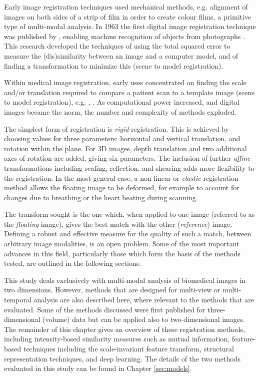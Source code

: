 \documentclass{report}
\begin{document}
Early image registration techniques used mechanical methods, e.g. alignment of images on both sides of a strip of film in order to create colour films, a primitive type of multi-modal analysis. In 1963 the first digital image registration technique was published by \citeauthor{roberts1963machine}, enabling machine recognition of objects from photographs \citep{roberts1963machine}. This research developed the techniques of using the total squared error to measure the (dis)similarity between an image and a computer model, and of finding a transformation to minimize this (scene to model registration).

Within medical image registration, early uses concentrated on finding the scale and/or translation required to compare a patient scan to a template image (scene to model registration), e.g. \cite{barber1976digital}, \cite{appledorn1980automated}. As computational power increased, and digital images became the norm, the number and complexity of methods exploded.


The simplest form of registration is \textit{rigid} registration. This is achieved by choosing values for three parameters: horizontal and vertical translation, and rotation within the plane. For 3D images, depth translation and two additional axes of rotation are added, giving six parameters. The inclusion of further \textit{affine} transformations including scaling, reflection, and shearing adds more flexibility to the registration. In the most general case, a non-linear or \textit{elastic} registration method allows the floating image to be deformed, for example to account for changes due to breathing or the heart beating during scanning.

The transform sought is the one which, when applied to one image (referred to as the \textit{floating} image), gives the best match with the other (\textit{reference}) image. Defining a robust and effective measure for the quality of such a match, between arbitrary image modalities, is an open problem. Some of the most important advances in this field, particularly those which form the basis of the methods tested, are outlined in the following sections.

This study deals exclusively with multi-modal analysis of biomedical images in two dimensions. However, methods that are designed for multi-view or multi-temporal analysis are also described here, where relevant to the methods that are evaluated. Some of the methods discussed were first published for three-dimensional (volume) data but can be applied also to two-dimensional images. The remainder of this chapter gives an overview of these registration methods, including intensity-based similarity measures such as mutual information, feature-based techniques including the scale-invariant feature transform, structural representation techniques, and deep learning. The details of the two methods evaluated in this study can be found in Chapter \ref{sec:models}.
\end{document}
